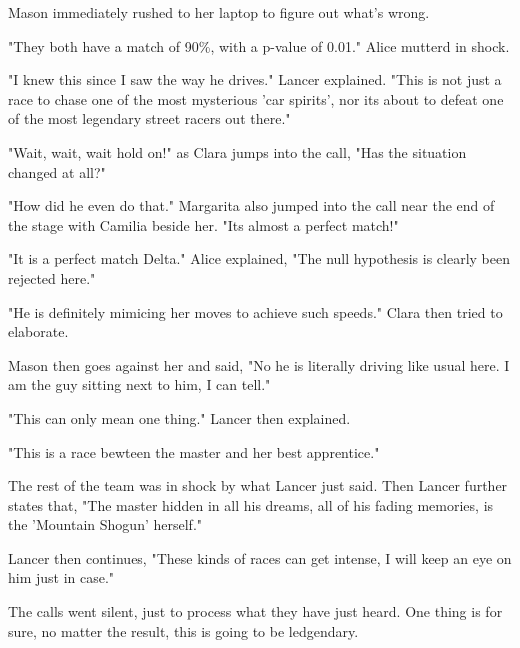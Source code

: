 Mason immediately rushed to her laptop to figure out what's wrong.

"They both have a match of 90\%, with a p-value of 0.01." Alice mutterd in shock.

"I knew this since I saw the way he drives." Lancer explained. "This is not just a race to chase one of the most mysterious 'car spirits', nor its about to defeat one of the most legendary street racers out there."

"Wait, wait, wait hold on!" as Clara jumps into the call, "Has the situation changed at all?"

"How did he even do that." Margarita also jumped into the call near the end of the stage with Camilia beside her. "Its almost a perfect match!"

"It is a perfect match Delta." Alice explained, "The null hypothesis is clearly been rejected here."

"He is definitely mimicing her moves to achieve such speeds." Clara then tried to elaborate.

Mason then goes against her and said, "No he is literally driving like usual here. I am the guy sitting next to him, I can tell."

"This can only mean one thing." Lancer then explained. 

\hfill

"This is a race bewteen the master and her best apprentice."

\hfill

The rest of the team was in shock by what Lancer just said. Then Lancer further states that, "The master hidden in all his dreams, all of his fading memories, is the 'Mountain Shogun' herself."

Lancer then continues, "These kinds of races can get intense, I will keep an eye on him just in case."

The calls went silent, just to process what they have just heard. One thing is for sure, no matter the result, this is going to be ledgendary.
